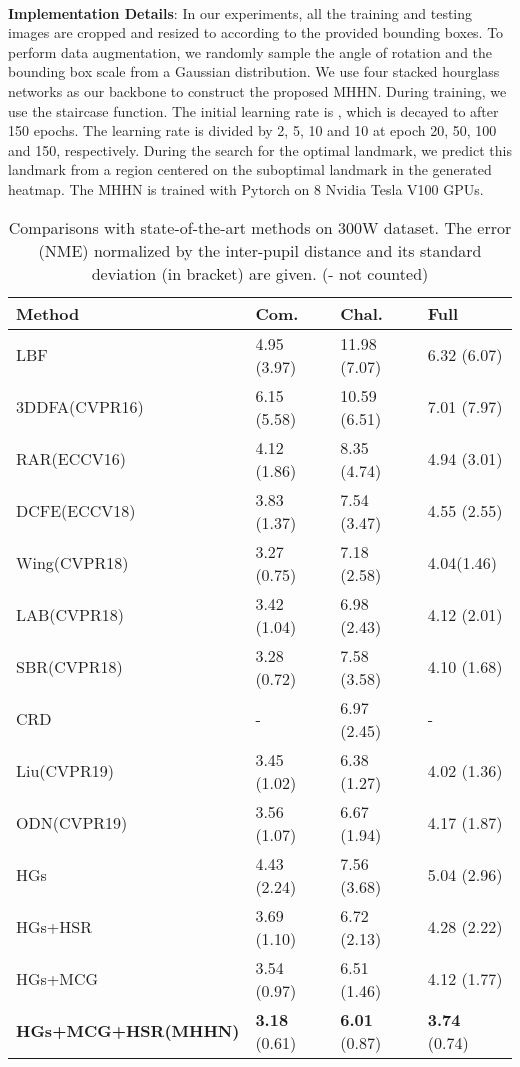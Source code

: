 \documentclass[journal]{IEEEtran}
\begin{document}
\\\indent\textbf{Implementation Details}: In our experiments, all the training and testing images are cropped and resized to  according to the provided bounding boxes. To perform data augmentation, we randomly sample the angle of rotation and the bounding box scale from a Gaussian distribution. We use four stacked hourglass networks as our backbone to construct the proposed MHHN. During training, we use the staircase function. The initial learning rate is , which is decayed to  after 150 epochs. The learning rate is divided by 2, 5, 10 and 10 at epoch 20, 50, 100 and 150, respectively. During the search for the optimal landmark, we predict this landmark from a  region centered on the suboptimal landmark in the generated heatmap. The MHHN is trained with Pytorch on 8 Nvidia Tesla V100 GPUs.
\begin{table}
	\caption{Comparisons with state-of-the-art methods on 300W dataset. The error (NME) normalized by the inter-pupil distance and its standard deviation (in bracket) are given. (- not counted)}
	\begin{center}
		\begin{tabular}{p{3cm}p{1.3cm}p{1.4cm}p{1.3cm}}
			\hline
			Method & Com.  & Chal.  & Full  \\
			\hline
			LBF\cite{ren2014face} &	4.95 (3.97) &	11.98 (7.07)&	6.32 (6.07)\\
			3DDFA(CVPR16)\cite{Zhu2016FaceAA}&	6.15 (5.58)&	10.59 (6.51)&	7.01 (7.97)\\
			RAR(ECCV16)\cite{Xiao2016Robust}&	4.12 (1.86)	&8.35 (4.74)	&4.94 (3.01)\\
			DCFE(ECCV18)\cite{Valle2018ADC}&	3.83 (1.37)&	7.54 (3.47)&	4.55 (2.55)\\
			Wing(CVPR18)\cite{Feng2017WingLF}&	3.27 (0.75)&	7.18 (2.58)&	4.04(1.46)\\
			LAB(CVPR18)\cite{Wu2018LookAB}&	3.42 (1.04)	&6.98 (2.43)&	4.12 (2.01)\\
			SBR(CVPR18)\cite{Dong2018SupervisionbyRegistrationAU}&	3.28 (0.72)&	7.58 (3.58)&	4.10 (1.68)\\
			CRD\cite{wan2020robust}&	-&	6.97 (2.45)&	-\\
			Liu(CVPR19)\cite{Liu2019SemanticAF} &	3.45 (1.02)&	6.38 (1.27)&	4.02 (1.36)\\
			ODN(CVPR19)\cite{Zhu2019RobustFL}	&3.56 (1.07)	&6.67 (1.94)&	4.17 (1.87)\\
			\hline
			HGs&	4.43 (2.24)&	7.56 (3.68)&	5.04 (2.96)\\
			HGs+HSR&	3.69 (1.10)&	6.72 (2.13)&	4.28 (2.22)\\
			HGs+MCG&	3.54 (0.97)&	6.51 (1.46)&	4.12 (1.77)\\
			\textbf{HGs+MCG+HSR(MHHN)}&	\textbf{3.18} (0.61)&	\textbf{6.01} (0.87)&	\textbf{3.74} (0.74)\\
			\hline
		\end{tabular}
	\end{center}
	\label{tab300w}
\end{table}
\end{document}
